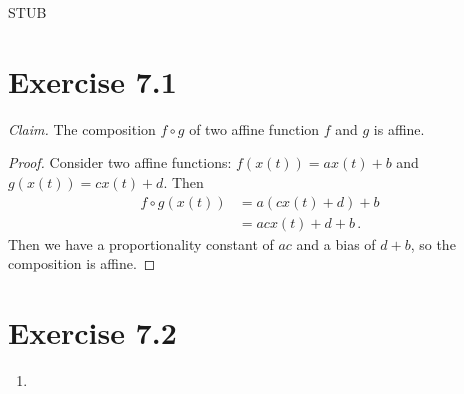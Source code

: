 \documentclass{abrice}
\begin{document}
STUB

\section{Exercise 7.1}

\textit{Claim.} The composition $f \circ g$ of two affine function $f$ and $g$
is affine.

\begin{proof}
  Consider two affine functions: $f(x(t)) = ax(t) + b$ and
  $g(x(t)) = cx(t) + d$. Then
  \begin{align*}
    f \circ g (x(t))
    &= a(cx(t) + d) + b \\
    &= acx(t) + d + b\, .
  \end{align*}
  Then we have a proportionality constant of $ac$ and a bias of $d + b$, so the
  composition is affine.
\end{proof}

\section{Exercise 7.2}

\begin{enumerate}[label= (\alph*)]
\item
\end{enumerate}
\end{document}
